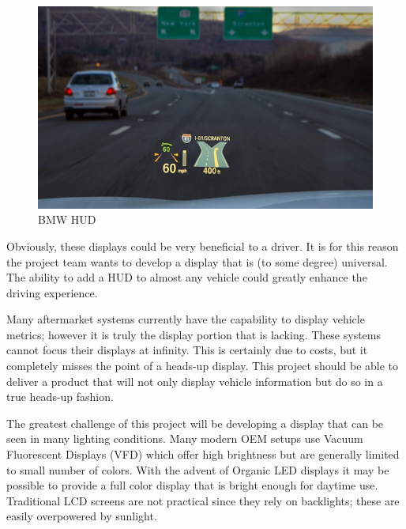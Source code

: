 \begin{figure}
	\includegraphics[width=\textwidth]{img/BMWHUD.jpg}
	\caption{BMW HUD}
	\label{fig:BMWHUD}
\end{figure}

Obviously, these displays could be very beneficial to a driver. It is for
this reason the project team wants to develop a display that is (to some
degree) universal. The ability to add a HUD to almost any vehicle could
greatly enhance the driving experience.

Many aftermarket systems currently have the capability to display vehicle
metrics; however it is truly the display portion that is lacking. These
systems cannot focus their displays at infinity. This is certainly due to
costs, but it completely misses the point of a heads-up display. This
project should be able to deliver a product that will not only display
vehicle information but do so in a true heads-up fashion.

The greatest challenge of this project will be developing a display that
can be seen in many lighting conditions. Many modern OEM setups use Vacuum
Fluorescent Displays (VFD) which offer high brightness but are generally
limited to small number of colors. With the advent of Organic LED displays
it may be possible to provide a full color display that is bright enough
for daytime use. Traditional LCD screens are not practical since they rely
on backlights; these are easily overpowered by sunlight.
